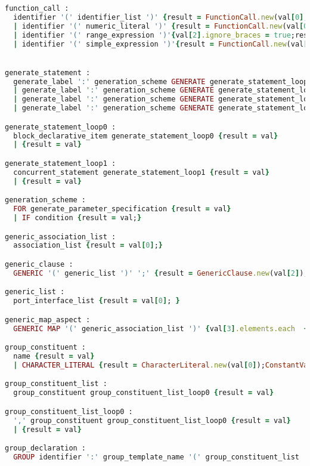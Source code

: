 \begin{lstlisting}[language=Ruby, style=rubystyle]
function_call :
  identifier '(' identifier_list ')' {result = FunctionCall.new(val[0], val[2]);}
  | identifier '(' numeric_literal ')' {result = FunctionCall.new(val[0], val[2]);}
  | identifier '(' range_expression ')'{val[2].ignore_braces = true;result = FunctionCall.new(val[0], val[2]);}
  | identifier '(' simple_expression ')'{result = FunctionCall.new(val[0], val[2]);}


generate_statement :
  generate_label ':' generation_scheme GENERATE generate_statement_loop0 BEGIN generate_statement_loop1 END GENERATE generate_label ';' {result = val}
  | generate_label ':' generation_scheme GENERATE generate_statement_loop1 END GENERATE generate_label ';' {result = val}
  | generate_label ':' generation_scheme GENERATE generate_statement_loop0 BEGIN generate_statement_loop1 END GENERATE ';' {result = val}
  | generate_label ':' generation_scheme GENERATE generate_statement_loop1 END GENERATE ';' {result = val}

generate_statement_loop0 :
  block_declarative_item generate_statement_loop0 {result = val}
  | {result = val}

generate_statement_loop1 :
  concurrent_statement generate_statement_loop1 {result = val}
  | {result = val}

generation_scheme :
  FOR generate_parameter_specification {result = val}
  | IF condition {result = val;}

generic_association_list :
  association_list {result = val[0];}

generic_clause :
  GENERIC '(' generic_list ')' ';' {result = GenericClause.new(val[2]);}

generic_list :
  port_interface_list {result = val[0]; }

generic_map_aspect :
  GENERIC MAP '(' generic_association_list ')' {val[3].elements.each  {|el| el.actual_part = el.actual_part.as_value }; result = PortMap.new('GENERIC', val[3]);}

group_constituent :
  name {result = val}
  | CHARACTER_LITERAL {result = CharacterLiteral.new(val[0]);ConstantValueRepository.add(result);}

group_constituent_list :
  group_constituent group_constituent_list_loop0 {result = val}

group_constituent_list_loop0 :
  ',' group_constituent group_constituent_list_loop0 {result = val}
  | {result = val}

group_declaration :
  GROUP identifier ':' group_template_name '(' group_constituent_list ')' ';' {result = val}


\end{lstlisting}

